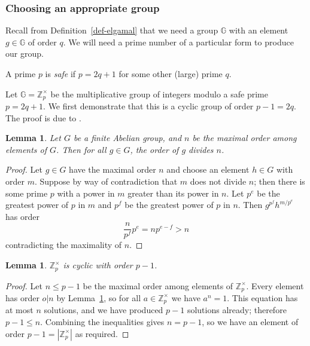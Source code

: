 \documentclass[12pt,a4paper]{article}
\newtheorem{lemma}[theorem]{Lemma}
\theoremstyle{definition}
\begin{document}
\subsubsection{Choosing an appropriate group}\label{app-elgamal-group}
Recall from Definition~\ref{def-elgamal} that we need a group $\mathbb{G}$ with an element $g\in\mathbb{G}$ of order $q$. We will need a prime number of a particular form to produce our group.
\begin{definition}
    A prime $p$ is \textit{safe} if $p=2q+1$ for some other (large) prime $q$.
\end{definition}
Let $\mathbb{G}=\mathbb{Z}^\times_p$ be the multiplicative group of integers modulo a safe prime $p=2q+1$. We first demonstrate that this is a cyclic group of order $p-1=2q$. The proof is due to \cite{cyclicity}.
\begin{lemma}\label{lem-order-divides}
    Let $G$ be a finite Abelian group, and $n$ be the maximal order among elements of $G$. Then for all $g\in G$, the order of $g$ divides $n$.
\end{lemma}
\begin{proof}
    Let $g\in G$ have the maximal order $n$ and choose an element $h\in G$ with order $m$. Suppose by way of contradiction that $m$ does not divide $n$; then there is some prime $p$ with a power in $m$ greater than its power in $n$. Let $p^e$ be the greatest power of $p$ in $m$ and $p^f$ be the greatest power of $p$ in $n$. Then $g^{p^f}h^{m/p^e}$ has order
    $$\frac{n}{p^f}p^e=np^{e-f}>n$$
    contradicting the maximality of $n$.
\end{proof}
\begin{lemma}
    $\mathbb{Z}^\times_p$ is cyclic with order $p-1$.
\end{lemma}
\begin{proof}
    Let $n\leq p-1$ be the maximal order among elements of $\mathbb{Z}^\times_p$. Every element has order $o\vert n$ by Lemma~\ref{lem-order-divides}, so for all $a\in\mathbb{Z}^\times_p$ we have $a^n=1$. This equation has at most $n$ solutions, and we have produced $p-1$ solutions already; therefore $p-1\leq n$.
    Combining the inequalities gives $n=p-1$, so we have an element of order $p-1=|\mathbb{Z}^\times_p|$ as required.
\end{proof}
\end{document}
